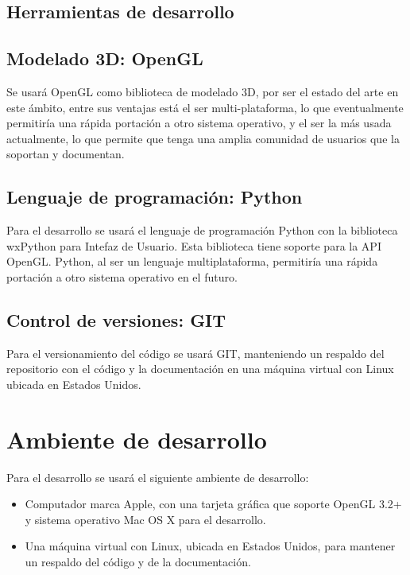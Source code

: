 \subsection{Herramientas de desarrollo}
\subsection{Modelado 3D: OpenGL}
Se usará OpenGL como biblioteca de modelado 3D, por ser el estado del arte en este ámbito, entre sus ventajas está el ser multi-plataforma, lo que eventualmente permitiría una rápida portación a otro sistema operativo, y el ser la más usada actualmente, lo que permite que tenga una amplia comunidad de usuarios que la soportan y documentan.

\subsection{Lenguaje de programación: Python}
Para el desarrollo se usará el lenguaje de programación Python con la biblioteca wxPython para Intefaz de Usuario. Esta biblioteca tiene soporte para la API OpenGL. Python, al ser un lenguaje multiplataforma, permitiría una rápida portación a otro sistema operativo en el futuro.

\subsection{Control de versiones: GIT}
Para el versionamiento del código se usará GIT, manteniendo un respaldo del repositorio con el código y la documentación en una máquina virtual con Linux ubicada en Estados Unidos.

\section{Ambiente de desarrollo}
Para el desarrollo se usará el siguiente ambiente de desarrollo:
\begin{itemize}
	\item Computador marca Apple, con una tarjeta gráfica que soporte OpenGL 3.2+ y sistema operativo Mac OS X para el desarrollo.
	\item Una máquina virtual con Linux, ubicada en Estados Unidos, para mantener un respaldo del código y de la documentación.
\end{itemize}
